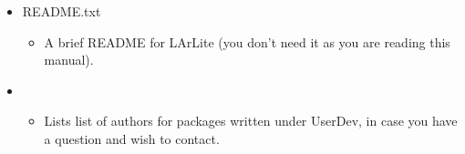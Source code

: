 \begin{itemize}
    \item {\ttfamily README.txt}
      \begin{itemize}
          \item A brief README for LArLite (you don't need it as you are reading this manual).
      \end{itemize}

    \item {}
      \begin{itemize}
          \item Lists list of authors for packages written under UserDev, in case you have a question and wish to contact.
      \end{itemize}
\end{itemize}
